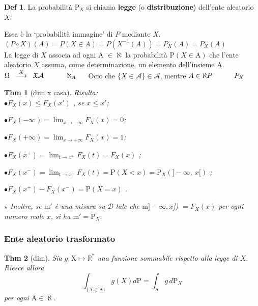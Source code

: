 \documentclass[a4paper,11pt]{article}
\theoremstyle{plain}
\newtheorem{thm}{Thm}[section]
\theoremstyle{definition}
\newtheorem{defn}{Def}[section]
\theoremstyle{remark}
\begin{document}
\begin{defn}
La probabilità $\mathrm{P}_{X}$ si chiama \textbf{legge} (o \textbf{distribuzione}) dell'ente aleatorio $X$. 
\end{defn}

\noindent
Essa è la ‘probabilità immagine' di $P$ mediante $X$. \\

\noindent
$(P \circ X)(A)=P(X \in A)=P(X^{-1}(A))=P_X(A)=P_X(A)$\\

La legge di $X$ associa ad ogni A $\in \aleph$ la probabilità $\mathrm{P}(X\in \mathrm{A})$ che l'ente aleatorio $X$ assuma, come determinazione, un elemento dell'insieme A.\\


\noindent
$\Omega \;\; \overset{X}{\longrightarrow} \;\; \mathfrak{X}\\
\mathcal{A} \;\;\;\;\;\;\; \,\,\,\;\;\; \aleph_A  \,\,\,\;\;\;$
Ocio che $\{X \in \mathcal{A}\} \in \mathcal{A}$, mentre $A \in \aleph \\
P \;\;\;\;\;\;\;\;\;\;\; P_{X}$
\\

\begin{thm}[dim x casa] Risulta:\\

$\bullet F_{X}(x)\leq F_{X}(x')$ , se $x\leq x'$;

$\bullet F_{X}(-\displaystyle \infty)=\lim_{x\rightarrow-\infty}F_{X}(x)=0$;

$\bullet F_{X}(+\displaystyle \infty)=\lim_{x\rightarrow+\infty}F_{X}(x)=1$;

$\bullet F_{X}(x^{+})=\displaystyle \lim_{t\rightarrow x^{+}}F_{X}(t)=F_{X}(x)$ ;

$\bullet F_{X}(x^{-})=\displaystyle \lim_{t\rightarrow x^{-}}F_{X}(t)=\mathrm{P}(X<x)=\mathrm{P}_{X}(]-\infty,\ x[)$ ;

$\bullet F_{X}(x^{+})-F_{X}(x^{-})=\mathrm{P}(X=x)$ .

$\star$ Inoltre, se $\mathrm{m}'$ è una misura su $\mathcal{B}$ tale che $\mathrm{m} ]-\infty, x$]) $=F_{X}(x)$ per ogni numero reale $x$, si ha $\mathrm{m}'=\mathrm{P}_{X}.$
\end{thm}

\subsubsection{Ente aleatorio trasformato}
\begin{thm} [dim]
Sia $g:\mathrm{X}\mapsto \mathbb{R}^{*}$ una funzione sommabile rispetto alla legge di $X.$ Riesce allora
$$
\int_{\{X\in \mathrm{A}\}}g(X)d\mathrm{P}=\int_{\mathrm{A}}g \, d\mathrm{P}_{X}
$$
per ogni $\mathrm{A}\in\aleph.$
\end{thm}
\end{document}
